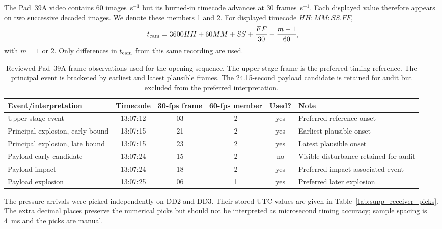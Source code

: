 \documentclass[]{seismica}
\begin{document}
The Pad~39A video contains 60 images~s$^{-1}$ but its burned-in timecode
advances at 30 frames~s$^{-1}$. Each displayed value therefore appears on two
successive decoded images. We denote these members 1 and 2. For displayed
timecode $HH{:}MM{:}SS.FF$,
\begin{equation}
 t_{\rm cam}=3600HH+60MM+SS+\frac{FF}{30}+\frac{m-1}{60},
\end{equation}
with $m=1$ or 2. Only differences in $t_{\rm cam}$ from this same recording are
used.

\begin{table}[!tbp]
\centering
\caption{Reviewed Pad~39A frame observations used for the opening sequence.
The upper-stage frame is the preferred timing reference. The principal event
is bracketed by earliest and latest plausible frames. The 24.15-second payload
candidate is retained for audit but excluded from the preferred interpretation.}
\label{tab:supp_video_frames}
\begin{tabularx}{\textwidth}{XccccX}
\hline
Event/interpretation & Timecode & 30-fps frame & 60-fps member & Used? & Note \\
\hline
Upper-stage event & 13:07:12 & 03 & 2 & yes & Preferred reference onset \\
Principal explosion, early bound & 13:07:15 & 21 & 2 & yes & Earliest plausible onset \\
Principal explosion, late bound & 13:07:15 & 23 & 2 & yes & Latest plausible onset \\
Payload early candidate & 13:07:24 & 15 & 2 & no & Visible disturbance retained for audit \\
Payload impact & 13:07:24 & 18 & 2 & yes & Preferred impact-associated event \\
Payload explosion & 13:07:25 & 06 & 1 & yes & Preferred later explosion \\
\hline
\end{tabularx}
\end{table}

The pressure arrivals were picked independently on DD2 and DD3. Their stored
UTC values are given in Table~\ref{tab:supp_receiver_picks}. The extra decimal
places preserve the numerical picks but should not be interpreted as
microsecond timing accuracy; sample spacing is 4~ms and the picks are manual.
\end{document}

